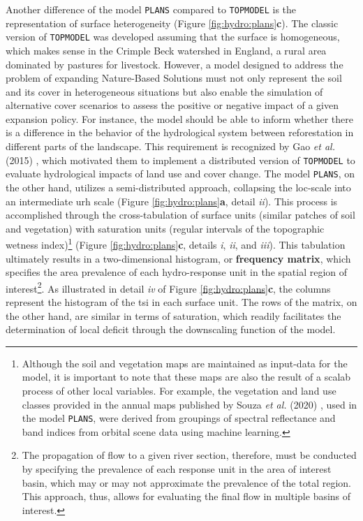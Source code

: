 \documentclass[./main_en.tex]{subfiles}
\begin{document}
\par Another difference of the \gls{model} \texttt{PLANS} compared to \texttt{TOPMODEL} is the representation of surface heterogeneity (Figure \ref{fig:hydro:plans}\textbf{c}). The classic version of \texttt{TOPMODEL} was developed assuming that the surface is homogeneous, which makes sense in the Crimple Beck watershed in England, a rural area dominated by pastures for livestock. However, a \gls{model} designed to address the problem of expanding Nature-Based Solutions must not only represent the soil and its cover in heterogeneous situations but also enable the simulation of alternative cover scenarios to assess the positive or negative impact of a given expansion policy. For instance, the \gls{model} should be able to inform whether there is a difference in the behavior of the hydrological \gls{system} between reforestation in different parts of the landscape. This requirement is recognized by Gao \textit{et al.} (2015) \cite{Gao2015a}, which motivated them to implement a distributed version of \texttt{TOPMODEL} to evaluate hydrological impacts of land use and cover change. The \gls{model} \texttt{PLANS}, on the other hand, utilizes a semi-distributed approach, collapsing the \gls{loc-scale} into an intermediate \gls{urh} scale (Figure \ref{fig:hydro:plans}\textbf{a}, detail \textit{ii}). This process is accomplished through the cross-tabulation of surface units (similar patches of soil and vegetation) with saturation units (regular intervals of the topographic wetness index)\footnote{Although the soil and vegetation maps are maintained as \gls{input-data} for the \gls{model}, it is important to note that these maps are also the result of a \gls{scalab} process of other local variables. For example, the vegetation and land use classes provided in the annual maps published by Souza \textit{et al.} (2020) \cite{Souza2020a}, used in the \gls{model} \texttt{PLANS}, were derived from groupings of spectral reflectance and band indices from orbital scene data using machine learning.} (Figure \ref{fig:hydro:plans}\textbf{c}, details \textit{i}, \textit{ii}, and \textit{iii}). This tabulation ultimately results in a two-dimensional histogram, or \textbf{frequency matrix}, which specifies the area prevalence of each \gls{hydro-response} unit in the spatial region of interest\footnote{The propagation of flow to a given river section, therefore, must be conducted by specifying the prevalence of each response unit in the area of interest basin, which may or may not approximate the prevalence of the total region. This approach, thus, allows for evaluating the final flow in multiple basins of interest.}. As illustrated in detail \textit{iv} of Figure \ref{fig:hydro:plans}\textbf{c}, the columns represent the histogram of the \gls{tsi} in each surface unit. The rows of the matrix, on the other hand, are similar in terms of saturation, which readily facilitates the determination of local deficit through the \gls{downscaling} function of the \gls{model}.
\end{document}

